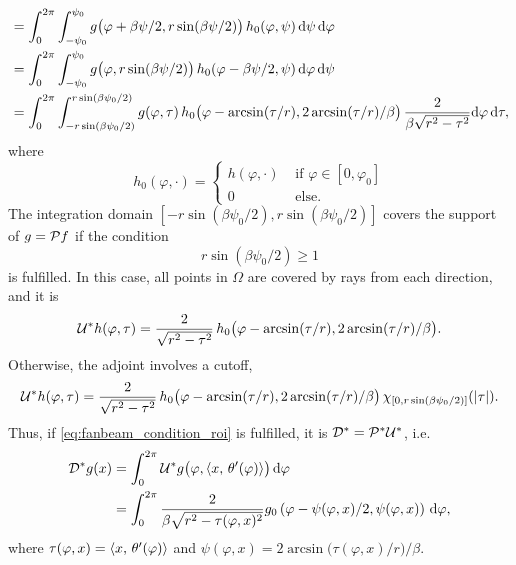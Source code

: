 \documentclass{amsart}
\renewcommand*{\phi}{\varphi}
\begin{document}
\begin{example}
\begin{align*}
  &= \int_0^{2\pi} \int_{-\psi_0}^{\psi_0} g\big(\phi + \beta\psi/2, r\sin(\beta\psi/2)\big)\, h_0(\phi, \psi)\, \D\psi\, \D\phi \\
  &= \int_0^{2\pi} \int_{-\psi_0}^{\psi_0} g\big(\phi, r\sin(\beta\psi/2)\big)\, h_0(\phi - \beta\psi/2, \psi)\, \D\phi\, \D\psi \\
  &= \int_0^{2\pi} \int_{-r\sin(\beta\psi_0/2)}^{r\sin(\beta\psi_0/2)} g(\phi, \tau)\, h_0\big(\phi - \arcsin(\tau/r), 
  2\arcsin(\tau/r)/\beta\big)\, \frac{2}{\beta\sqrt{r^2-\tau^2}} \D\phi\, \D\tau,
 \end{align*}
 where
 \begin{equation*}
  h_0(\phi, \cdot) =
  \begin{cases}
   h(\phi, \cdot) & \text{ if } \phi \in [0,\phi_0] \\
   0 & \text{ else}.
  \end{cases}
 \end{equation*}
 The integration domain $[-r\sin(\beta\psi_0/2), r\sin(\beta\psi_0/2)]$ covers the support of $g = {\mathcal{P}} f$ if the condition
 \begin{equation}
  \label{eq:fanbeam_condition_roi}
  r \sin(\beta\psi_0/2) \geq 1
 \end{equation}
 is fulfilled. In this case, all points in $\Omega$ are covered by rays from each direction, and it is
 \begin{equation}
  \label{eq:fanbeam_unit_trafo_adj_good}
  \DUALOPU h(\phi, \tau) = \frac{2}{\sqrt{r^2-\tau^2}} \, h_0\big(\phi - \arcsin(\tau/r), 2\arcsin(\tau/r)/\beta\big).
 \end{equation}
 Otherwise, the adjoint involves a cutoff,
 \begin{equation}
  \label{eq:fanbeam_unit_trafo_adj_bad}
  \DUALOPU h(\phi, \tau) = \frac{2}{\sqrt{r^2-\tau^2}} \, h_0\big(\phi - \arcsin(\tau/r), 2\arcsin(\tau/r)/\beta\big)\, 
  \chi_{[0, r\sin(\beta\psi_0/2)]}(\ABS{\tau}).
 \end{equation}
 Thus, if \eqref{eq:fanbeam_condition_roi} is fulfilled, it is ${{\mathcal{D}}^*} = {{\mathcal{P}}^*}{{\mathcal{U}}^*}$, i.e.
 \begin{align}
  \DUALOPD g(x)
  &= \int_0^{2\pi} \DUALOPU g\big(\phi, \INNER{x}{\theta'(\phi)}\big)\, \D\phi \notag\\
  \label{eq:fanbeam_backproj}
  &= \int_0^{2\pi} \frac{2}{\beta\sqrt{r^2-\tau(\phi, x)^2}} g_0\left(\phi - \psi(\phi,x)/2, \psi(\phi,x) \right)\, \D\phi,
 \end{align}
 where $\tau(\phi,x) = \INNER{x}{\theta'(\phi)}$ and $\psi(\phi,x) = 2\arcsin\big(\tau(\phi,x)/r\big) / \beta$.\\[1ex]

\end{example}
\end{document}

